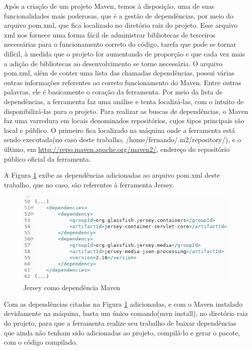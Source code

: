 \documentclass[12pt]{article}
\begin{document}
Após a criação de um projeto Maven, temos à disposição, uma de suas funcionalidades mais poderosas, que é a gestão de dependências, por meio do arquivo pom.xml, que fica localizado no diretório raiz do projeto. Esse arquivo xml nos fornece uma forma fácil de administrar bibliotecas de terceiros necessárias para o funcionamento correto do código, tarefa que pode se tornar difícil, à medida que o projeto for aumentando de proporção e que cada vez mais a adição de bibliotecas ao desenvolvimento se torne necessária. O arquivo pom.xml, além de conter uma lista das chamadas dependências, possui várias outras informações referentes ao correto funcionamento do Maven. Entre outras palavras, ele é basicamente o coração da ferramenta. 
Por meio da lista de dependências, a ferramenta faz uma análise e tenta localizá-las, com o intuito de disponibilizá-las para o projeto. Para realizar as buscas de dependências, o Maven faz uma varredura em locais denominados repositórios, cujos tipos principais são local e público. O primeiro fica localizado na máquina onde a ferramenta está sendo executada(no caso deste trabalho, /home/fernando/.m2/repository/), e o último, em \url{http://repo.maven.apache.org/maven2/}, endereço do repositório público oficial da ferramenta.

A Figura \ref{fig:Figura5} exibe as dependências adicionadas ao arquivo pom.xml deste trabalho, que no caso, são referentes à ferramenta Jersey.
\begin{figure}[ht]
	\centering
	\includegraphics[width=.9\textwidth]{jersey-pom.png}
	\caption{Jersey como dependência Maven}
	\label{fig:Figura5}
\end{figure}


Com as dependências citadas na Figura \ref{fig:Figura5} adicionadas, e com o Maven instalado devidamente na máquina, basta um único comando(mvn install), no diretório raiz do projeto, para que a ferramenta realize seu trabalho de baixar dependências que ainda não tenham sido adicionadas ao projeto, compilá-lo e gerar o pacote, com o código compilado.
\end{document}
